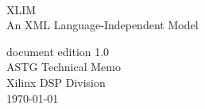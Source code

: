 
\thispagestyle{empty}


\HRule\\
\begin{flushright}
  {\Huge XLIM} \\\vspace{3mm}
  {\Large An XML Language-Independent Model}\\\vspace{2mm}
\end{flushright}
\HRule




\begin{flushright}
\Large{}
\end{flushright}
\begin{center}
  {\Large document edition 1.0}\\\vspace{2mm}
  {\large ASTG Technical Memo \\
  Xilinx DSP Division \\
  \today}
\end{center}
